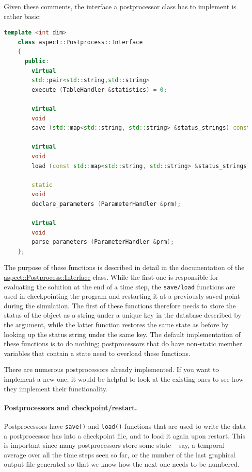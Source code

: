\documentclass{article}
\begin{document}
Given these comments, the interface a postprocessor class has to implement is
rather basic:
\begin{lstlisting}[frame=single,language=C++]
    template <int dim>
    class aspect::Postprocess::Interface
    {
      public:
        virtual
        std::pair<std::string,std::string>
        execute (TableHandler &statistics) = 0;

        virtual
        void
        save (std::map<std::string, std::string> &status_strings) const;

        virtual
        void
        load (const std::map<std::string, std::string> &status_strings);

        static
        void
        declare_parameters (ParameterHandler &prm);

        virtual
        void
        parse_parameters (ParameterHandler &prm);
    };
\end{lstlisting}
The purpose of these functions is described in detail in the documentation of
the
\href{doc/doxygen/classaspect_1_1Postprocess_1_1Interface.html}{aspect::Postprocess::Interface}
class. While the first one is responsible for evaluating the solution at the
end of a time step, the \texttt{save/load} functions are used in checkpointing
the program and restarting it at a previously saved point during the
simulation. The first of these functions therefore needs to store the status
of the object as a string under a unique key in the database described by the
argument, while the latter function restores the same state as before by
looking up the status string under the same key. The default implementation of
these functions is to do nothing; postprocessors that do have non-static
member variables that contain a state need to overload these functions.

There are numerous postprocessors already implemented. If you want to
implement a new one, it would be helpful to look at the existing ones to see
how they implement their functionality.

\paragraph{Postprocessors and checkpoint/restart.} Postprocessors have
\texttt{save()} and \texttt{load()} functions that are used to write the data
a postprocessor has into a checkpoint file, and to load it again upon
restart. This is important since many postprocessors store some state -- say,
a temporal average over all the time steps seen so far, or the number of the
last graphical output file generated so that we know how the next one needs
to be numbered.
\end{document}
